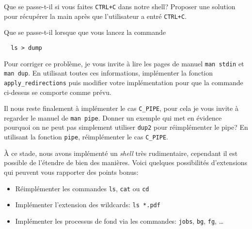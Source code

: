 \documentclass{exam}
\begin{document}
\begin{questions}
Que se passe-t-il si vous faites \texttt{CTRL+C} dans notre shell? Proposer une
solution pour récupérer la main après que l'utilisateur a entré \texttt{CTRL+C}.

Que se passe-t-il lorsque que vous lancez la commande
\begin{verbatim}
  ls > dump
\end{verbatim}
Pour corriger ce problème, je vous invite à lire les pages de manuel
\texttt{man stdin} et \texttt{man dup}. En utilisant toutes
ces informations, implémenter la fonction \texttt{apply_redirections}
puis modifier votre implémentation pour que la commande ci-dessus se comporte
comme prévu.

Il nous reste finalement à implémenter le cas \texttt{C_PIPE}, pour cela
je vous invite à regarder le manuel de \texttt{man pipe}. Donner un
exemple qui met en évidence pourquoi on ne peut pas simplement utiliser
\texttt{dup2} pour réimplémenter le pipe? En utilisant la fonction
\texttt{pipe}, réimplémenter le cas \texttt{C_PIPE}.

À ce stade, nous avons implémenté un \textit{shell} très rudimentaire, cependant
il est possible de l'étendre de bien des manières. Voici quelques possibilités
d'extensions qui peuvent vous rapporter des points bonus:

\begin{itemize}
  \item Réimplémenter les commandes \texttt{ls},
    \texttt{cat} ou \texttt{cd}
  \item Implémenter l'extension des wildcards: \texttt{ls *.pdf}
  \item Implémenter les processus de fond via les commandes:
    \texttt{jobs}, \texttt{bg}, \texttt{fg}, \dots
\end{itemize}

\end{questions}
\end{document}
